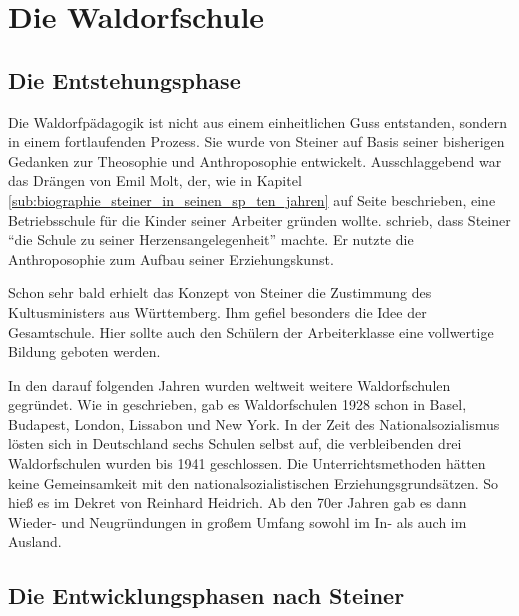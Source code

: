 \section{Die Waldorfschule}

\subsection{Die Entstehungsphase} %
\label{sub:die_entstehungsphase}

Die Waldorfpädagogik ist nicht aus einem einheitlichen Guss entstanden, sondern in einem fortlaufenden Prozess. Sie wurde von Steiner auf Basis seiner bisherigen Gedanken zur Theosophie und Anthroposophie entwickelt. Ausschlaggebend war das Drängen von Emil Molt, der, wie in Kapitel \ref{sub:biographie_steiner_in_seinen_sp_ten_jahren} auf Seite \pageref{sub:biographie_steiner_in_seinen_sp_ten_jahren} beschrieben, eine Betriebsschule für die Kinder seiner Arbeiter gründen wollte. \citet[S. 125]{hemleben63} schrieb, dass Steiner \enquote{die Schule zu seiner Herzensangelegenheit} machte. Er nutzte die Anthroposophie zum Aufbau seiner Erziehungskunst.

Schon sehr bald erhielt das Konzept von Steiner die Zustimmung des Kultusministers aus Württemberg. Ihm gefiel besonders die Idee der Gesamtschule. Hier sollte auch den Schülern der Arbeiterklasse eine vollwertige Bildung geboten werden. \citep[Vgl.][S. 279]{frielingsdorf12} 

In den darauf folgenden Jahren wurden weltweit weitere Waldorfschulen gegründet. Wie in \citet{wikipedia2} geschrieben, gab es Waldorfschulen 1928 schon in Basel, Budapest, London, Lissabon und New York. In der Zeit des Nationalsozialismus lösten sich in Deutschland sechs Schulen selbst auf, die verbleibenden drei Waldorfschulen wurden bis 1941 geschlossen. Die Unterrichtsmethoden hätten  keine Gemeinsamkeit mit den nationalsozialistischen Erziehungsgrundsätzen. So hieß es im Dekret von Reinhard Heidrich. Ab den 70er Jahren gab es dann Wieder- und Neugründungen in großem Umfang sowohl im In- als auch im Ausland. \citep[Vgl.][]{wikipedia2} 


\subsection{Die Entwicklungsphasen nach Steiner} %
\label{sub:Ziele, Besonderheiten, Rolle von Lehrern und Schülern}


